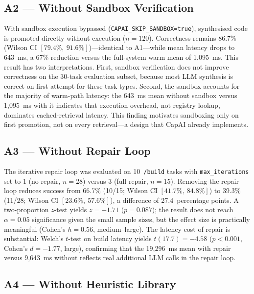 \documentclass[conference]{IEEEtran}
\begin{document}
\subsection{A2 --- Without Sandbox Verification}

With sandbox execution bypassed (\texttt{CAPAI\_SKIP\_SANDBOX=true}),
synthesised code is promoted directly without execution ($n=120$).
Correctness remains 86.7\% (Wilson CI $[79.4\%,\ 91.6\%]$)---identical
to A1---while mean latency drops to 643~ms, a 67\% reduction versus the
full-system warm mean of 1{,}095~ms.
This result has two interpretations.
First, sandbox verification does not improve correctness on the 30-task
evaluation subset, because most LLM synthesis is correct on first attempt
for these task types.
Second, the sandbox accounts for the majority of warm-path latency: the
643~ms mean without sandbox versus 1{,}095~ms with it indicates that
execution overhead, not registry lookup, dominates cached-retrieval
latency.
This finding motivates sandboxing only on first promotion, not on every
retrieval---a design that CapAI already implements.

\subsection{A3 --- Without Repair Loop}

The iterative repair loop was evaluated on 10~\texttt{/build} tasks with
\texttt{max\_iterations} set to 1 (no repair, $n=28$) versus 3 (full
repair, $n=15$).
Removing the repair loop reduces success from 66.7\% (10/15; Wilson CI
$[41.7\%,\ 84.8\%]$) to 39.3\% (11/28; Wilson CI $[23.6\%,\ 57.6\%]$),
a difference of 27.4~percentage points.
A two-proportion $z$-test yields $z=-1.71$ ($p=0.087$); the result does
not reach $\alpha=0.05$ significance given the small sample sizes, but
the effect size is practically meaningful (Cohen's $h=0.56$, medium--large).
The latency cost of repair is substantial: Welch's $t$-test on build
latency yields $t(17.7)=-4.58$ ($p<0.001$, Cohen's $d=-1.77$, large),
confirming that the 19{,}296~ms mean with repair versus 9{,}643~ms without
reflects real additional LLM calls in the repair loop.

\subsection{A4 --- Without Heuristic Library}
\end{document}
